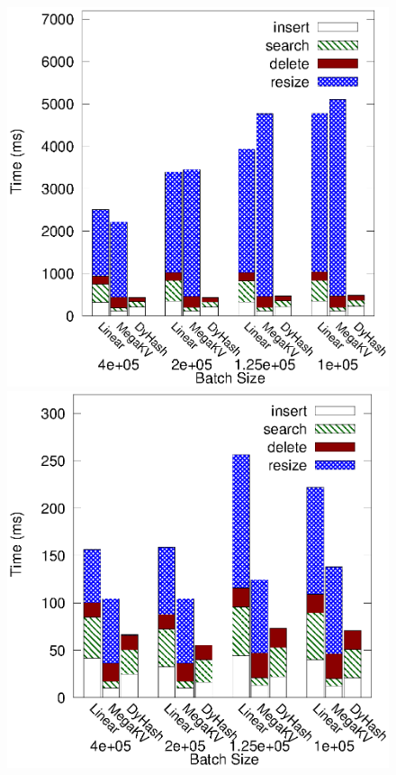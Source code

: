\begin{figure}[h]
\begin{minipage}{0.18\linewidth}
		\centerline{\dsreddit}
	\end{minipage}
	\hfill
	\begin{minipage}{0.18\linewidth}\centering
		\includegraphics[width=\linewidth]{pic/dynamic/tpch/diff_batch_size.eps}
		\centerline{\dstpch}
	\end{minipage}
	\hfill
	\begin{minipage}{0.18\linewidth}\centering
		\includegraphics[width=\linewidth]{pic/dynamic/ali/diff_batch_size.eps}

\end{minipage}
\end{figure}
